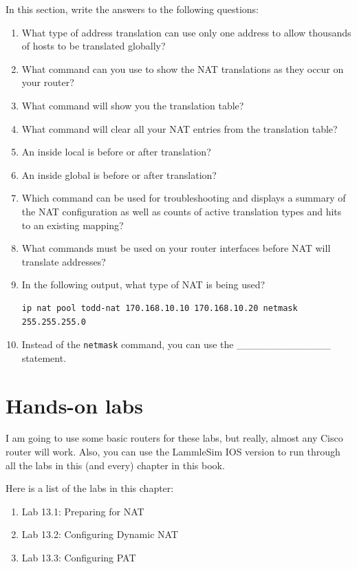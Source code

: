 \documentclass[b5paper,11pt]{memoir}
\begin{document}
In this section,
write the answers to the following questions:

\begin{enumerate}
\item
  What type of address translation can use only one address to allow
  thousands of hosts to be translated globally?
\item
  What command can you use to show the NAT translations as they occur on
  your router?
\item
  What command will show you the translation table?
\item
  What command will clear all your NAT entries from the translation
  table?
\item
  An inside local is before or after translation?
\item
  An inside global is before or after translation?
\item
  Which command can be used for troubleshooting and displays a summary
  of the NAT configuration as well as counts of active translation types
  and hits to an existing mapping?
\item
  What commands must be used on your router interfaces before NAT will
  translate addresses?
\item
  In the following output, what type of NAT is being used?

\begin{verbatim}
ip nat pool todd-nat 170.168.10.10 170.168.10.20 netmask 255.255.255.0
\end{verbatim}
\item
  Instead of the \texttt{netmask} command, you can use the
  \_\_\_\_\_\_\_\_\_\_\_\_\_ statement.
\end{enumerate}




\section{Hands-on labs}

I am going to use some basic routers for these labs, but really, almost
any Cisco router will work. Also, you can use the LammleSim IOS version
to run through all the labs in this (and every) chapter in this book.

Here is a list of the labs in this chapter:

\begin{enumerate}
\tightlist
\item
  Lab 13.1: Preparing for NAT
\item
  Lab 13.2: Configuring Dynamic NAT
\item
  Lab 13.3: Configuring PAT
\end{enumerate}
\end{document}
